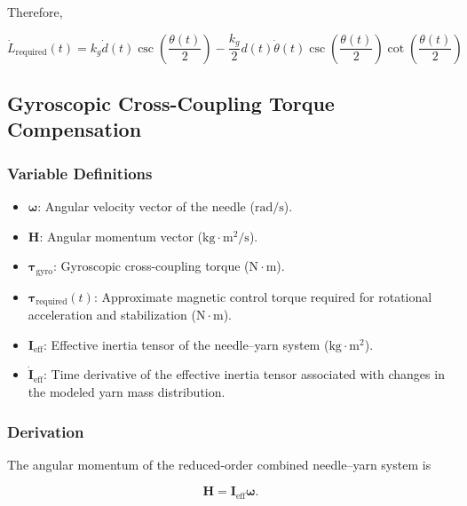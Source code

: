 \documentclass[12pt, a4paper]{article}
\begin{document}
Therefore,

\begin{equation}
\boxed{
\dot{L}_{\text{required}}(t)
=
k_g\dot{d}(t)
\csc\left(\frac{\theta(t)}{2}\right)
-
\frac{k_g}{2}
d(t)\dot{\theta}(t)
\csc\left(\frac{\theta(t)}{2}\right)
\cot\left(\frac{\theta(t)}{2}\right)
}
\end{equation}

\subsection{Gyroscopic Cross-Coupling Torque Compensation}

\subsubsection*{Variable Definitions}

\begin{itemize}
\item $\boldsymbol{\omega}$: Angular velocity vector of the needle ($\mathrm{rad/s}$).
\item $\mathbf{H}$: Angular momentum vector ($\mathrm{kg\cdot m^2/s}$).
\item $\boldsymbol{\tau}_{\text{gyro}}$: Gyroscopic cross-coupling torque ($\mathrm{N\cdot m}$).
\item $\boldsymbol{\tau}_{\text{required}}(t)$: Approximate magnetic control torque required for rotational acceleration and stabilization ($\mathrm{N\cdot m}$).
\item $\mathbf{I}_{\text{eff}}$: Effective inertia tensor of the needle--yarn system ($\mathrm{kg\cdot m^2}$).
\item $\dot{\mathbf{I}}_{\text{eff}}$: Time derivative of the effective inertia tensor associated with changes in the modeled yarn mass distribution.
\end{itemize}

\subsubsection*{Derivation}

The angular momentum of the reduced-order combined needle--yarn system is

\begin{equation}
\mathbf{H}
=
\mathbf{I}_{\text{eff}}
\boldsymbol{\omega}.
\end{equation}
\end{document}
